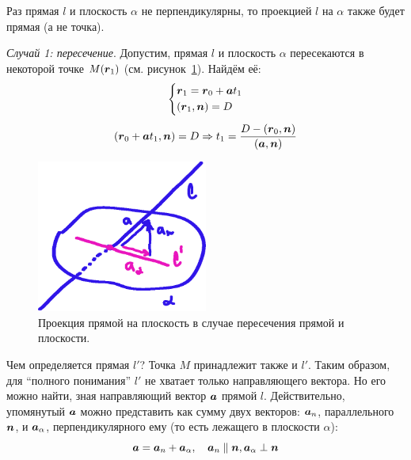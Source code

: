 \documentclass[a4paper,12pt]{article}
\begin{document}
  \begin{solution}
    
    Раз прямая $l$ и плоскость $\alpha$ не перпендикулярны, то проекцией $l$ на $\alpha$ также будет прямая (а не точка).
    
    \medskip
    
    \emph{Случай 1: пересечение}.
    Допустим, прямая $l$ и плоскость $\alpha$ пересекаются в некоторой точке $M(\boldsymbol r_1)$ (см. рисунок~\ref{fig:project-line-when-intersect}).
    Найдём её:
    \[
      \left\{
        \begin{aligned}
          &\boldsymbol r_1 = \boldsymbol r_0 + \boldsymbol a t_1\\
          &(\boldsymbol r_1, \boldsymbol n) = D
        \end{aligned}
      \right.
    \]
    \[
      (\boldsymbol r_0 + \boldsymbol a t_1, \boldsymbol n) = D \Rightarrow t_1 = \frac{D - (\boldsymbol r_0, \boldsymbol n)}{(\boldsymbol a, \boldsymbol n)}
    \]
    
    \begin{figure}[h]
      \centering
      
      \includegraphics[width=0.5\textwidth]{project-line-when-intersect}
      
      \caption{Проекция прямой на плоскость в случае пересечения прямой и плоскости.}
      \label{fig:project-line-when-intersect}
    \end{figure}
    
    Чем определяется прямая $l'$?
    Точка $M$ принадлежит также и $l'$.
    Таким образом, для ``полного понимания'' $l'$ не хватает только направляющего вектора.
    Но его можно найти, зная направляющий вектор $\boldsymbol a$ прямой $l$.
    Действительно, упомянутый $\boldsymbol a$ можно представить как сумму двух векторов: $\boldsymbol a_n$, параллельного $\boldsymbol n$, и $\boldsymbol a_{\alpha}$, перпендикулярного ему (то есть лежащего в плоскости $\alpha$):
    \[
      \boldsymbol a = \boldsymbol a_n + \boldsymbol a_{\alpha},\quad \boldsymbol a_n \parallel \boldsymbol n, \boldsymbol a_{\alpha} \perp \boldsymbol n
    \]
    

\end{solution}
\end{document}
